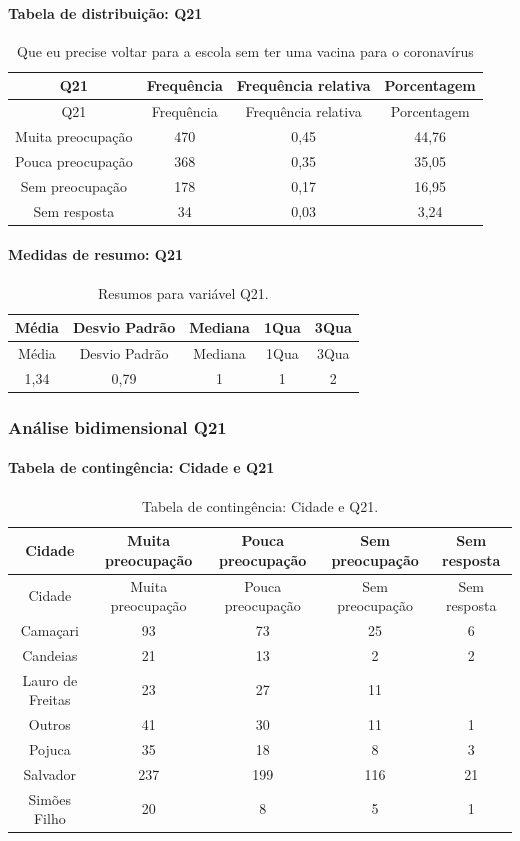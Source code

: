 \documentclass[]{article}
\let\oldparagraph\paragraph
\renewcommand{\paragraph}[1]{\oldparagraph{#1}\mbox{}}
\begin{document}
\hypertarget{tabela-de-distribuiuxe7uxe3o-q21}{%
\paragraph{Tabela de distribuição: Q21}\label{tabela-de-distribuiuxe7uxe3o-q21}}

\begin{longtable}[]{@{}cccc@{}}
\caption{\label{tab:unnamed-chunk-324}Que eu precise voltar para a escola sem ter uma vacina para o coronavírus}\tabularnewline
\toprule
Q21 & Frequência & Frequência relativa & Porcentagem\tabularnewline
\midrule
\endfirsthead
\toprule
Q21 & Frequência & Frequência relativa & Porcentagem\tabularnewline
\midrule
\endhead
Muita preocupação & 470 & 0,45 & 44,76\tabularnewline
Pouca preocupação & 368 & 0,35 & 35,05\tabularnewline
Sem preocupação & 178 & 0,17 & 16,95\tabularnewline
Sem resposta & 34 & 0,03 & 3,24\tabularnewline
\bottomrule
\end{longtable}

\hypertarget{medidas-de-resumo-q21}{%
\paragraph{Medidas de resumo: Q21}\label{medidas-de-resumo-q21}}

\begin{longtable}[]{@{}ccccc@{}}
\caption{\label{tab:unnamed-chunk-325}Resumos para variável Q21.}\tabularnewline
\toprule
Média & Desvio Padrão & Mediana & 1Qua & 3Qua\tabularnewline
\midrule
\endfirsthead
\toprule
Média & Desvio Padrão & Mediana & 1Qua & 3Qua\tabularnewline
\midrule
\endhead
1,34 & 0,79 & 1 & 1 & 2\tabularnewline
\bottomrule
\end{longtable}

\cleardoublepage

\hypertarget{anuxe1lise-bidimensional-q21}{%
\subsubsection{Análise bidimensional Q21}\label{anuxe1lise-bidimensional-q21}}

\hypertarget{tabela-de-continguxeancia-cidade-e-q21}{%
\paragraph{Tabela de contingência: Cidade e Q21}\label{tabela-de-continguxeancia-cidade-e-q21}}

\begin{longtable}[]{@{}ccccc@{}}
\caption{\label{tab:unnamed-chunk-326}Tabela de contingência: Cidade e Q21.}\tabularnewline
\toprule
Cidade & Muita preocupação & Pouca preocupação & Sem preocupação & Sem resposta\tabularnewline
\midrule
\endfirsthead
\toprule
Cidade & Muita preocupação & Pouca preocupação & Sem preocupação & Sem resposta\tabularnewline
\midrule
\endhead
Camaçari & 93 & 73 & 25 & 6\tabularnewline
Candeias & 21 & 13 & 2 & 2\tabularnewline
Lauro de Freitas & 23 & 27 & 11 &\tabularnewline
Outros & 41 & 30 & 11 & 1\tabularnewline
Pojuca & 35 & 18 & 8 & 3\tabularnewline
Salvador & 237 & 199 & 116 & 21\tabularnewline
Simões Filho & 20 & 8 & 5 & 1\tabularnewline
\bottomrule
\end{longtable}
\end{document}
